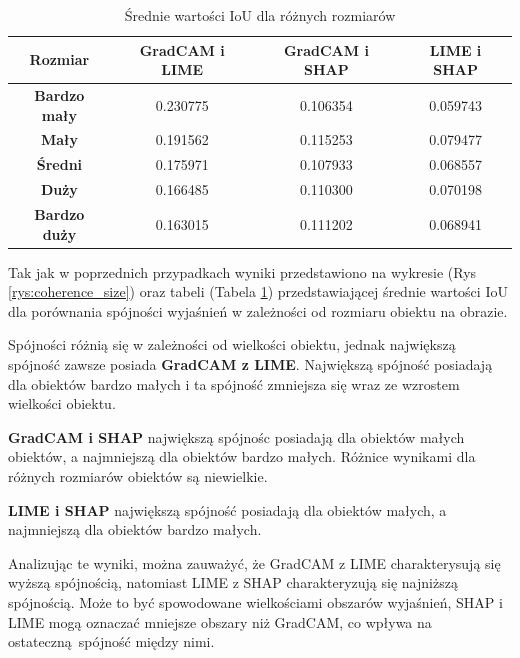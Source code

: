 \begin{table}[h]
	\centering
	\begin{tabular}{|c|c|c|c|}
		\hline
		\textbf{Rozmiar}     & \textbf{GradCAM i LIME} & \textbf{GradCAM i SHAP} & \textbf{LIME i SHAP} \\
		\hline
		\textbf{Bardzo mały} & 0.230775                & 0.106354                & 0.059743             \\
		\hline
		\textbf{Mały}        & 0.191562                & 0.115253                & 0.079477             \\
		\hline
		\textbf{Średni}      & 0.175971                & 0.107933                & 0.068557             \\
		\hline
		\textbf{Duży}        & 0.166485                & 0.110300                & 0.070198             \\
		\hline
		\textbf{Bardzo duży} & 0.163015                & 0.111202                & 0.068941             \\
		\hline
	\end{tabular}
	\caption{Średnie wartości IoU dla różnych rozmiarów}
	\label{tab:base_coherence_size}
\end{table}

Tak jak w poprzednich przypadkach wyniki przedstawiono na wykresie (Rys \ref{rys:coherence_size}) oraz tabeli (Tabela \ref{tab:base_coherence_size}) przedstawiającej średnie wartości IoU dla porównania spójności wyjaśnień w zależności od rozmiaru obiektu na obrazie.

Spójności różnią się w zależności od wielkości obiektu, jednak największą spójność zawsze posiada \textbf{GradCAM z LIME}.
Największą spójność posiadają dla obiektów bardzo małych i ta spójność zmniejsza się wraz ze wzrostem wielkości obiektu.

\textbf{GradCAM i SHAP} największą spójnośc posiadają dla obiektów małych obiektów, a najmniejszą dla obiektów bardzo małych.
Różnice wynikami dla różnych rozmiarów obiektów są niewielkie.

\textbf{LIME i SHAP} największą spójność posiadają dla obiektów małych, a najmniejszą dla obiektów bardzo małych.

\vspace{1cm}
Analizując te wyniki, można zauważyć, że GradCAM z LIME charakterysują się wyższą spójnością, natomiast LIME z SHAP charakteryzują się najniższą spójnością.
Może to być spowodowane wielkościami obszarów wyjaśnień, SHAP i LIME mogą oznaczać mniejsze obszary niż GradCAM, co wpływa na ostateczną spójność między nimi.
